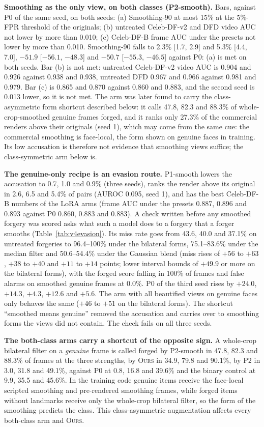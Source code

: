 \documentclass[10pt]{article}
\newcommand{\ours}{\textsc{Ours}}
\begin{document}
\textbf{Smoothing as the only view, on both classes (P2-smooth).} Bars, against P0 of the same seed, on both seeds: (a)
Smoothing-90 at most 15\% at the 5\%-FPR threshold of the originals; (b) untreated Celeb-DF-v2 and DFD video AUC not lower by more
than 0.010; (c) Celeb-DF-B frame AUC under the presets not lower by more than 0.010. Smoothing-90 falls to 2.3\% [1.7, 2.9] and
5.3\% [4.4, 7.0], $-51.9$ [$-56.1$, $-48.3$] and $-50.7$ [$-55.3$, $-46.5$] against P0: (a) is met on both seeds. Bar (b) is not
met: untreated Celeb-DF-v2 video AUC is 0.904 and 0.926 against 0.938 and 0.938, untreated DFD 0.967 and 0.966 against 0.981 and
0.979. Bar (c) is 0.865 and 0.870 against 0.860 and 0.883, and the second seed is 0.013 lower, so it is not met. The arm was later
found to carry the class-asymmetric form shortcut described below: it calls 47.8, 82.3 and 88.3\% of whole-crop-smoothed genuine
frames forged, and it ranks only 27.3\% of the commercial renders above their originals (seed 1), which may come from the same cue:
the commercial smoothing is face-local, the form shown on genuine faces in training. Its low accusation is therefore not
evidence that smoothing views suffice; the class-symmetric arm below is.

\textbf{The genuine-only recipe is an evasion route.} P1-smooth lowers the accusation to 0.7, 1.0 and 0.9\% (three seeds), ranks the
render above its original in 2.6, 6.5 and 5.4\% of pairs (AUROC 0.095, seed 1), and has the best Celeb-DF-B numbers of the LoRA arms
(frame AUC under the presets 0.887, 0.896 and 0.893 against P0 0.860, 0.883 and 0.883). A check written before any smoothed forgery
was scored asks what such a model does to a forgery that a forger smooths (Table~\ref{tab:v4evasion}). Its miss rate goes from
43.6, 40.0 and 37.1\% on untreated forgeries to 96.4--100\% under the bilateral forms, 75.1--83.6\% under the median filter and
50.6--54.4\% under the Gaussian blend (miss rises of $+56$ to $+63$, $+38$ to $+40$ and $+11$ to $+14$ points; lower interval bounds
of $+49.9$ or more on the bilateral forms), with the forged score falling in 100\% of frames and false alarms on smoothed genuine
frames at 0.0\%. P0 of the third seed rises by $+24.0$, $+14.3$, $+4.3$, $+12.6$ and $+5.6$. The arm with all beautified views on
genuine faces only behaves the same ($+46$ to $+51$ on the bilateral forms). The shortcut ``smoothed means genuine'' removed the
accusation and carries over to smoothing forms the views did not contain. The check fails on all three seeds.

\textbf{The both-class arms carry a shortcut of the opposite sign.} A whole-crop bilateral filter on a \emph{genuine} frame is
called forged by P2-smooth in 47.8, 82.3 and 88.3\% of frames at the three strengths, by \ours{} in 34.9, 79.8 and 90.1\%, by P2 in
3.0, 31.8 and 49.1\%, against P0 at 0.8, 16.8 and 39.6\% and the binary control at 9.9, 35.5 and 45.6\%. In the training code
genuine items receive the face-local scripted smoothing and pre-rendered smoothing frames, while forged items without landmarks
receive only the whole-crop bilateral filter, so the form of the smoothing predicts the class. This class-asymmetric augmentation
affects every both-class arm and \ours{}.
\end{document}
